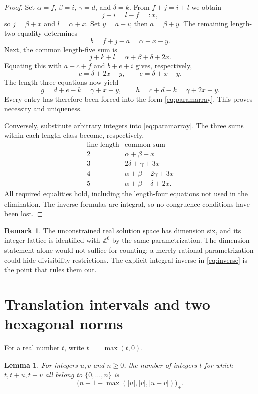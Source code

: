 \documentclass[11pt]{article}
\numberwithin{equation}{section}
\newtheorem{lemma}[theorem]{Lemma}
\theoremstyle{definition}
\newtheorem{remark}[theorem]{Remark}
\newcommand{\Z}{\mathbb Z}
\begin{document}
\begin{proof}
Set $\alpha=f$, $\beta=i$, $\gamma=d$, and $\delta=k$. From
$f+j=i+l$ we obtain
\[
 j-i=l-f=:x,
\]
so $j=\beta+x$ and $l=\alpha+x$. Set $y=a-i$; then
$a=\beta+y$. The remaining length-two equality determines
\[
 b=f+j-a=\alpha+x-y.
\]
Next, the common length-five sum is
\[
 j+k+l=\alpha+\beta+\delta+2x.
\]
Equating this with $a+c+f$ and $b+e+i$ gives, respectively,
\[
 c=\delta+2x-y,\qquad e=\delta+x+y.
\]
The length-three equations now yield
\[
 g=d+e-k=\gamma+x+y,\qquad
 h=c+d-k=\gamma+2x-y.
\]
Every entry has therefore been forced into the form
\eqref{eq:paramarray}. This proves necessity and uniqueness.

Conversely, substitute arbitrary integers into \eqref{eq:paramarray}. The
three sums within each length class become, respectively,
\[
\begin{array}{c|c}
\text{line length}&\text{common sum}\\ \hline
2&\alpha+\beta+x\\
3&2\delta+\gamma+3x\\
4&\alpha+\beta+2\gamma+3x\\
5&\alpha+\beta+\delta+2x.
\end{array}
\]
All required equalities hold, including the length-four equations not used in
the elimination. The inverse formulas are integral, so no congruence
conditions have been lost.
\end{proof}

\begin{remark}
The unconstrained real solution space has dimension six, and its integer
lattice is identified with $\Z^6$ by the same parametrization. The dimension
statement alone would not suffice for counting: a merely rational
parametrization could hide divisibility restrictions. The explicit integral
inverse in \eqref{eq:inverse} is the point that rules them out.
\end{remark}

\section{Translation intervals and two hexagonal norms}
\label{sec:norms}

For a real number $t$, write $t_+=\max(t,0)$.

\begin{lemma}\label{lem:range}
For integers $u,v$ and $n\geq0$, the number of integers $t$ for which
$t,t+u,t+v$ all belong to $\{0,\ldots,n\}$ is
\begin{equation}\label{eq:triplecount}
\bigl(n+1-\max(|u|,|v|,|u-v|)\bigr)_+.
\end{equation}
\end{lemma}
\end{document}

